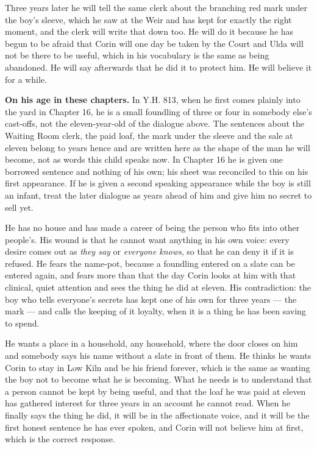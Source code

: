 \documentclass{design/chronicle}
\begin{document}
{Three years later he will tell the same clerk about the branching red mark under the boy’s sleeve, which he saw at the Weir and has kept for exactly the right moment, and the clerk will write that down too. He will do it because he has begun to be afraid that Corin will one day be taken by the Court and Ulda will not be there to be useful, which in his vocabulary is the same as being abandoned. He will say afterwards that he did it to protect him. He will believe it for a while.

\textbf{On his age in these chapters.} In Y.H. 813, when he first comes plainly into the yard in Chapter 16, he is a small foundling of three or four in somebody else’s cast-offs, not the eleven-year-old of the dialogue above. The sentences about the Waiting Room clerk, the paid loaf, the mark under the sleeve and the sale at eleven belong to years hence and are written here as the shape of the man he will become, not as words this child speaks now. In Chapter 16 he is given one borrowed sentence and nothing of his own; his sheet was reconciled to this on his first appearance. If he is given a second speaking appearance while the boy is still an infant, treat the later dialogue as years ahead of him and give him no secret to sell yet.

He has no house and has made a career of being the person who fits into other people’s. His wound is that he cannot want anything in his own voice: every desire comes out as \emph{they say} or \emph{everyone knows}, so that he can deny it if it is refused. He fears the name-pot, because a foundling entered on a slate can be entered again, and fears more than that the day Corin looks at him with that clinical, quiet attention and sees the thing he did at eleven. His contradiction: the boy who tells everyone’s secrets has kept one of his own for three years — the mark — and calls the keeping of it loyalty, when it is a thing he has been saving to spend.

He wants a place in a household, any household, where the door closes on him and somebody says his name without a slate in front of them. He thinks he wants Corin to stay in Low Kiln and be his friend forever, which is the same as wanting the boy not to become what he is becoming. What he needs is to understand that a person cannot be kept by being useful, and that the loaf he was paid at eleven has gathered interest for three years in an account he cannot read. When he finally says the thing he did, it will be in the affectionate voice, and it will be the first honest sentence he has ever spoken, and Corin will not believe him at first, which is the correct response.

}
\end{document}
